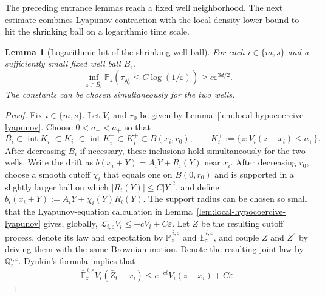 \documentclass[11pt]{article}
\numberwithin{equation}{section}
\theoremstyle{plain}
\newtheorem{lemma}[theorem]{Lemma}
\theoremstyle{definition}
\theoremstyle{remark}
\newcommand{\eps}{\varepsilon}
\newcommand{\E}{\mathbb E}
\newcommand{\Pbb}{\mathbb P}
\newcommand{\calL}{\mathcal L}
\begin{document}
The preceding entrance lemmas reach a fixed well
neighborhood.  The next estimate combines Lyapunov contraction with the local
density lower bound to hit the shrinking ball on a logarithmic time scale.

	\begin{lemma}[Logarithmic hit of the shrinking well ball]
	\label{lem:original-log-hit-shrinking-ball}
	For each $i\in\{m,s\}$ and a sufficiently small fixed well ball $B_i$,
	\[
	\inf_{z\in\overline{B_i}}
	\Pbb_z\left(\tau_{\mathsf A_\eps^i}\le C\log(1/\eps)\right)
	\ge c\eps^{3d/2}.
\]
The constants can be chosen simultaneously for the two wells.
\end{lemma}

	\begin{proof}
	Fix $i\in\{m,s\}$.  Let $V_i$ and $r_0$ be given by
	Lemma~\ref{lem:local-hypocoercive-lyapunov}.  Choose
	$0<a_-<a_+$ so that
	\[
	\overline{B_i}\subset\operatorname{int}K_i^-\subset K_i^-
	\subset\operatorname{int}K_i^+\subset K_i^+\subset B(x_i,r_0),
	\qquad
	K_i^\pm:=\{z:V_i(z-x_i)\le a_\pm\}.
	\]
	After decreasing $B_i$ if necessary, these inclusions hold simultaneously for
	the two wells.  Write the drift as $b(x_i+Y)=A_iY+R_i(Y)$ near $x_i$.
	After decreasing $r_0$, choose a smooth cutoff $\chi_i$ that equals one on
	$B(0,r_0)$ and is supported in a slightly larger ball on which
	$|R_i(Y)|\le C|Y|^2$, and define
	$\bar b_i(x_i+Y):=A_iY+\chi_i(Y)R_i(Y)$.  The support radius can be chosen
	so small that the Lyapunov-equation calculation in
	Lemma~\ref{lem:local-hypocoercive-lyapunov} gives, globally,
	$\bar{\calL}_{i,\eps}V_i\le-cV_i+C\eps$.  Let $\bar Z$ be the resulting
	cutoff process, denote its law and expectation by
	$\overline{\Pbb}_z^{\,i,\eps}$ and $\overline{\E}_z^{\,i,\eps}$, and couple
	$\bar Z$ and $Z^\eps$ by driving them with the same Brownian motion.  Denote
	the resulting joint law by $\mathbb Q_z^{i,\eps}$.
	Dynkin's formula implies that
	\[
	\overline{\E}_z^{\,i,\eps} V_i(\bar Z_t-x_i)
	\le e^{-ct}V_i(z-x_i)+C\eps .
	\]


\end{proof}
\end{document}

